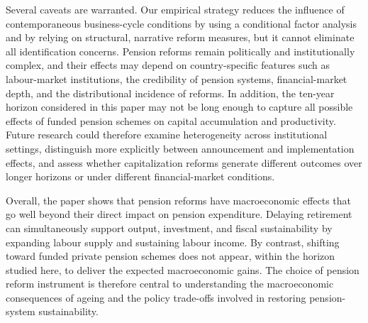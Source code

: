 \documentclass[11pt,english,a4paper, twoside, authoryear]{article}
\begin{document}
Several caveats are warranted. Our empirical strategy reduces the influence of contemporaneous business-cycle conditions by using a conditional factor analysis and by relying on structural, narrative reform measures, but it cannot eliminate all identification concerns. Pension reforms remain politically and institutionally complex, and their effects may depend on country-specific features such as labour-market institutions, the credibility of pension systems, financial-market depth, and the distributional incidence of reforms. In addition, the ten-year horizon considered in this paper may not be long enough to capture all possible effects of funded pension schemes on capital accumulation and productivity. Future research could therefore examine heterogeneity across institutional settings, distinguish more explicitly between announcement and implementation effects, and assess whether capitalization reforms generate different outcomes over longer horizons or under different financial-market conditions.

Overall, the paper shows that pension reforms have macroeconomic effects that go well beyond their direct impact on pension expenditure. Delaying retirement can simultaneously support output, investment, and fiscal sustainability by expanding labour supply and sustaining labour income. By contrast, shifting toward funded private pension schemes does not appear, within the horizon studied here, to deliver the expected macroeconomic gains. The choice of pension reform instrument is therefore central to understanding the macroeconomic consequences of ageing and the policy trade-offs involved in restoring pension-system sustainability.



%



\clearpage

\setcounter{table}{0}
\renewcommand{\thefigure}{A.\arabic{figure}}
\renewcommand{\thetable}{A.\arabic{table}}



\appendix
\end{document}
